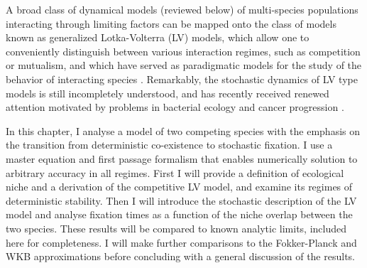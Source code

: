 A broad class of dynamical models (reviewed below) of multi-species populations interacting through limiting factors can be mapped onto the class of models known as generalized Lotka-Volterra (LV) models, which allow one to conveniently distinguish between various interaction regimes, such as competition or mutualism, and which have served as paradigmatic models for the study of the behavior of interacting species \cite{Volterra1926,Bomze1983,Chesson1990,Antal2006,Chotibut2015,Dobrinevski2012,Fisher2014,Constable2015,Lin2012,Gabel2013,Kessler2015,Young2018}. %
Remarkably, the stochastic dynamics of LV type models is still incompletely understood, and has recently received renewed attention motivated by problems in bacterial ecology and cancer progression \cite{VanMelderen2009,Stirk2010,Fisher2014,Chotibut2015,Capitan2017,Kessler2014}. %

In this chapter, I analyse a model of two competing species with the emphasis on the transition from deterministic co-existence to stochastic fixation. %
I use a master equation and first passage formalism that enables numerically solution to arbitrary accuracy in all regimes. 
First I will provide a definition of ecological niche and a derivation of the competitive LV model, and examine its regimes of deterministic stability. 
Then I will introduce the stochastic description of the LV model and analyse fixation times as a function of the niche overlap between the two species. 
These results will be compared to known analytic limits, included here for completeness. 
I will make further comparisons to the Fokker-Planck and WKB approximations before concluding with a general discussion of the results. 


